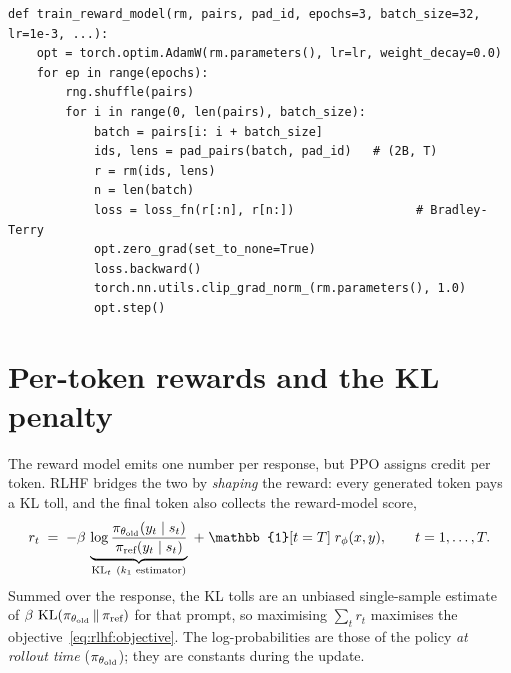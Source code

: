 \begin{lstlisting}[caption={Training the reward model on stacked pairs (\ident{llmsys/rlhf/ppo.py}, abridged).},label={lst:rlhf:rmtrain}]
def train_reward_model(rm, pairs, pad_id, epochs=3, batch_size=32, lr=1e-3, ...):
    opt = torch.optim.AdamW(rm.parameters(), lr=lr, weight_decay=0.0)
    for ep in range(epochs):
        rng.shuffle(pairs)
        for i in range(0, len(pairs), batch_size):
            batch = pairs[i: i + batch_size]
            ids, lens = pad_pairs(batch, pad_id)   # (2B, T)
            r = rm(ids, lens)
            n = len(batch)
            loss = loss_fn(r[:n], r[n:])                 # Bradley-Terry
            opt.zero_grad(set_to_none=True)
            loss.backward()
            torch.nn.utils.clip_grad_norm_(rm.parameters(), 1.0)
            opt.step()
\end{lstlisting}

\section{Per-token rewards and the KL penalty}\label{sec:rlhf:kl}

The reward model emits one number per response, but PPO assigns credit per token. RLHF bridges the two by
\emph{shaping} the reward: every generated token pays a KL toll, and the final token also collects the
reward-model score,
\begin{equation}
  r_t \;=\; -\beta\,\underbrace{\log\frac{\piold(y_t\mid s_t)}{\piref(y_t\mid s_t)}}_{\text{KL}_t\ (k_1\text{ estimator})}
  \;+\; \mathbb{1}[t = T]\; r_\phi(x, y),
  \qquad t = 1,\dots,T.
  \label{eq:rlhf:shaped}
\end{equation}
Summed over the response, the KL tolls are an unbiased single-sample estimate of
$\beta\,\operatorname{KL}(\pi_{\theta_{\text{old}}}\,\|\,\pi_{\text{ref}})$ for that prompt, so maximising $\sum_t r_t$ maximises the
objective~\eqref{eq:rlhf:objective}. The log-probabilities are those of the
policy \emph{at rollout time} ($\pi_{\theta_{\text{old}}}$); they are constants during the update.

